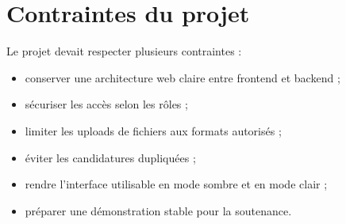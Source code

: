\section{Contraintes du projet}

\noindent
Le projet devait respecter plusieurs contraintes :

\begin{itemize}
    \item conserver une architecture web claire entre frontend et backend ;
    \item sécuriser les accès selon les rôles ;
    \item limiter les uploads de fichiers aux formats autorisés ;
    \item éviter les candidatures dupliquées ;
    \item rendre l'interface utilisable en mode sombre et en mode clair ;
    \item préparer une démonstration stable pour la soutenance.
\end{itemize}
